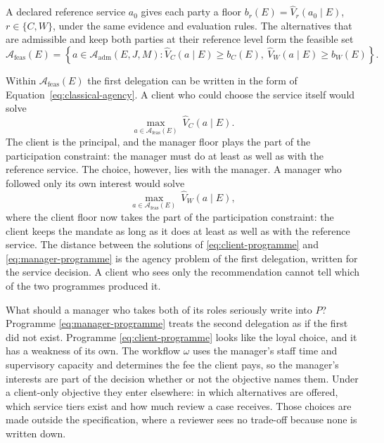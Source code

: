 \documentclass[oneside,10pt,english]{swissi}
\begin{document}
A declared reference service $a_0$ gives each party a floor $b_r(E)=\widehat V_r(a_0\mid E)$, $r\in\{C,W\}$, under the same evidence and evaluation rules. The alternatives that are admissible and keep both parties at their reference level form the feasible set
\begin{equation}
 \mathcal A_{\mathrm{feas}}(E)=\left\{a\in\mathcal A_{\mathrm{adm}}(E,J,M):
 \widehat V_C(a\mid E)\ge b_C(E),\ \widehat V_W(a\mid E)\ge b_W(E)\right\}.
 \label{eq:feasible-joint}
\end{equation}

Within $\mathcal A_{\mathrm{feas}}(E)$ the first delegation can be written in the form of Equation~\eqref{eq:classical-agency}. A client who could choose the service itself would solve
\begin{equation}
 \max_{a\in\mathcal A_{\mathrm{feas}}(E)}\ \widehat V_C(a\mid E).
 \tag{C}\label{eq:client-programme}
\end{equation}
The client is the principal, and the manager floor plays the part of the participation constraint: the manager must do at least as well as with the reference service. The choice, however, lies with the manager. A manager who followed only its own interest would solve
\begin{equation}
 \max_{a\in\mathcal A_{\mathrm{feas}}(E)}\ \widehat V_W(a\mid E),
 \tag{W}\label{eq:manager-programme}
\end{equation}
where the client floor now takes the part of the participation constraint: the client keeps the mandate as long as it does at least as well as with the reference service. The distance between the solutions of \eqref{eq:client-programme} and \eqref{eq:manager-programme} is the agency problem of the first delegation, written for the service decision. A client who sees only the recommendation cannot tell which of the two programmes produced it.

What should a manager who takes both of its roles seriously write into $P$? Programme \eqref{eq:manager-programme} treats the second delegation as if the first did not exist. Programme \eqref{eq:client-programme} looks like the loyal choice, and it has a weakness of its own. The workflow $\omega$ uses the manager's staff time and supervisory capacity and determines the fee the client pays, so the manager's interests are part of the decision whether or not the objective names them. Under a client-only objective they enter elsewhere: in which alternatives are offered, which service tiers exist and how much review a case receives. Those choices are made outside the specification, where a reviewer sees no trade-off because none is written down.
\end{document}
